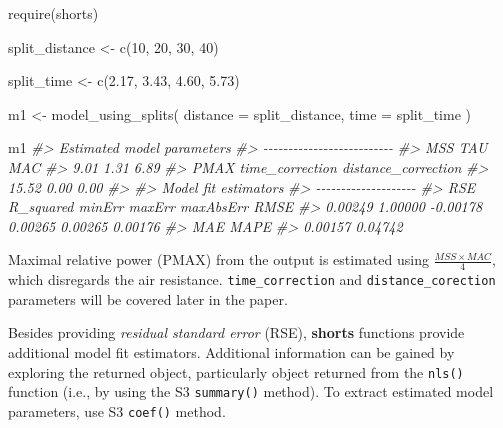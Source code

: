 \documentclass[fleqn,10pt,lineno]{wlpeerj} %
\newenvironment{Shaded}{\begin{snugshade}}{\end{snugshade}}
\newcommand{\AttributeTok}[1]{\textcolor[rgb]{0.77,0.63,0.00}{#1}}
\newcommand{\CommentTok}[1]{\textcolor[rgb]{0.56,0.35,0.01}{\textit{#1}}}
\newcommand{\DecValTok}[1]{\textcolor[rgb]{0.00,0.00,0.81}{#1}}
\newcommand{\FloatTok}[1]{\textcolor[rgb]{0.00,0.00,0.81}{#1}}
\newcommand{\FunctionTok}[1]{\textcolor[rgb]{0.00,0.00,0.00}{#1}}
\newcommand{\NormalTok}[1]{#1}
\newcommand{\OtherTok}[1]{\textcolor[rgb]{0.56,0.35,0.01}{#1}}
\begin{document}
\begin{Shaded}
\begin{Highlighting}[]
\FunctionTok{require}\NormalTok{(shorts)}

\NormalTok{split\_distance }\OtherTok{\textless{}{-}} \FunctionTok{c}\NormalTok{(}\DecValTok{10}\NormalTok{, }\DecValTok{20}\NormalTok{, }\DecValTok{30}\NormalTok{, }\DecValTok{40}\NormalTok{)}

\NormalTok{split\_time }\OtherTok{\textless{}{-}} \FunctionTok{c}\NormalTok{(}\FloatTok{2.17}\NormalTok{, }\FloatTok{3.43}\NormalTok{, }\FloatTok{4.60}\NormalTok{, }\FloatTok{5.73}\NormalTok{)}

\NormalTok{m1 }\OtherTok{\textless{}{-}} \FunctionTok{model\_using\_splits}\NormalTok{(}
  \AttributeTok{distance =}\NormalTok{ split\_distance,}
  \AttributeTok{time =}\NormalTok{ split\_time}
\NormalTok{)}

\NormalTok{m1}
\CommentTok{\#\textgreater{} Estimated model parameters}
\CommentTok{\#\textgreater{} {-}{-}{-}{-}{-}{-}{-}{-}{-}{-}{-}{-}{-}{-}{-}{-}{-}{-}{-}{-}{-}{-}{-}{-}{-}{-}}
\CommentTok{\#\textgreater{}                 MSS                 TAU                 MAC }
\CommentTok{\#\textgreater{}                9.01                1.31                6.89 }
\CommentTok{\#\textgreater{}                PMAX     time\_correction distance\_correction }
\CommentTok{\#\textgreater{}               15.52                0.00                0.00 }
\CommentTok{\#\textgreater{} }
\CommentTok{\#\textgreater{} Model fit estimators}
\CommentTok{\#\textgreater{} {-}{-}{-}{-}{-}{-}{-}{-}{-}{-}{-}{-}{-}{-}{-}{-}{-}{-}{-}{-}}
\CommentTok{\#\textgreater{}       RSE R\_squared    minErr    maxErr maxAbsErr      RMSE }
\CommentTok{\#\textgreater{}   0.00249   1.00000  {-}0.00178   0.00265   0.00265   0.00176 }
\CommentTok{\#\textgreater{}       MAE      MAPE }
\CommentTok{\#\textgreater{}   0.00157   0.04742}
\end{Highlighting}
\end{Shaded}

Maximal relative power (PMAX) from the output is estimated using \(\frac{MSS \times MAC}{4}\), which disregards the air resistance. \texttt{time\_correction} and \texttt{distance\_corection} parameters will be covered later in the paper.

Besides providing \emph{residual standard error} (RSE), \textbf{shorts} functions provide additional model fit estimators. Additional information can be gained by exploring the returned object, particularly object returned from the \texttt{nls()} function (i.e., by using the S3 \texttt{summary()} method). To extract estimated model parameters, use S3 \texttt{coef()} method.
\end{document}
